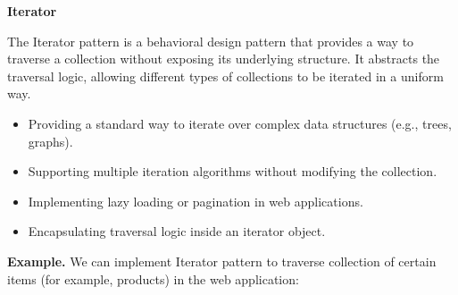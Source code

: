 \medskip
\begin{center}
\textbf{Iterator}
\end{center}

The Iterator pattern is a behavioral design pattern that provides a way to traverse a collection without exposing its underlying structure. It abstracts the traversal logic, allowing different types of collections to be iterated in a uniform way.

\begin{itemize}
\item Providing a standard way to iterate over complex data structures (e.g., trees, graphs).

\item Supporting multiple iteration algorithms without modifying the collection.

\item Implementing lazy loading or pagination in web applications.

\item Encapsulating traversal logic inside an iterator object.
\end{itemize}

\textbf{Example.} We can implement Iterator pattern to traverse collection of certain items (for example, products) in the web application:


